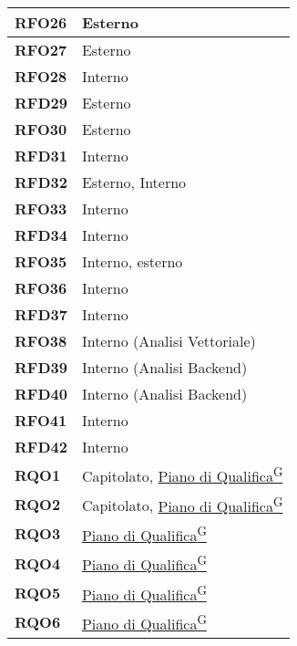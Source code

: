 \begin{longtable}{|>{\centering\arraybackslash}m{}|>{\centering\arraybackslash}m{}|}
	\textbf{RFO26}            & Esterno\\\hline
	\textbf{RFO27}            & Esterno\\\hline
	\textbf{RFO28}            & Interno\\\hline
	\textbf{RFD29}            & Esterno\\\hline
	\textbf{RFO30}            & Esterno\\\hline
	\textbf{RFD31}            & Interno\\\hline
	\textbf{RFD32}            & Esterno, Interno\\\hline
	\textbf{RFO33}            & Interno\\\hline
	\textbf{RFD34}            & Interno\\\hline
	\textbf{RFO35}            & Interno, esterno\\\hline
	\textbf{RFO36}            & Interno\\\hline
	\textbf{RFD37}            & Interno\\\hline	
	\textbf{RFO38}            & Interno (Analisi Vettoriale) \\\hline
	\textbf{RFD39}            & Interno (Analisi Backend) \\\hline
	\textbf{RFD40}            & Interno (Analisi Backend) \\\hline
	\textbf{RFO41}            & Interno \\\hline
	\textbf{RFD42}            & Interno \\\hline
    
	\textbf{RQO1}            & Capitolato, \href{https://code7crusaders.github.io/docs/RTB/documentazione_interna/glossario.html#piano-di-qualifica}{Piano di Qualifica\textsuperscript{G}}\\\hline
	\textbf{RQO2}            & Capitolato, \href{https://code7crusaders.github.io/docs/RTB/documentazione_interna/glossario.html#piano-di-qualifica}{Piano di Qualifica\textsuperscript{G}}\\\hline
	\textbf{RQO3}            & \href{https://code7crusaders.github.io/docs/RTB/documentazione_interna/glossario.html#piano-di-qualifica}{Piano di Qualifica\textsuperscript{G}}\\\hline
    \textbf{RQO4}            & \href{https://code7crusaders.github.io/docs/RTB/documentazione_interna/glossario.html#piano-di-qualifica}{Piano di Qualifica\textsuperscript{G}}\\\hline
	\textbf{RQO5}            & \href{https://code7crusaders.github.io/docs/RTB/documentazione_interna/glossario.html#piano-di-qualifica}{Piano di Qualifica\textsuperscript{G}}\\\hline
	\textbf{RQO6}            & \href{https://code7crusaders.github.io/docs/RTB/documentazione_interna/glossario.html#piano-di-qualifica}{Piano di Qualifica\textsuperscript{G}}\\\hline


\end{longtable}
